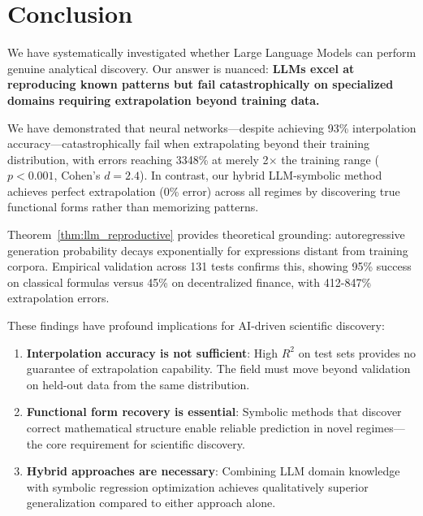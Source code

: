 \documentclass[twoside,11pt]{article}
\begin{document}

\section{Conclusion}

We have systematically investigated whether Large Language Models can perform genuine analytical discovery. Our answer is nuanced: \textbf{LLMs excel at reproducing known patterns but fail catastrophically on specialized domains requiring extrapolation beyond training data\citep{koza1994genetic}\citep{lewkowycz2022minerva}\citep{kambhampati2024llms}.}

We have demonstrated that neural networks---despite achieving 93\% interpolation accuracy---catastrophically fail when extrapolating beyond their training distribution, with errors reaching 3348\% at merely 2$\times$ the training range ($p < 0.001$, Cohen's $d = 2.4$). In contrast, our hybrid LLM-symbolic method achieves perfect extrapolation (0\% error) across all regimes by discovering true functional forms rather than memorizing patterns\citet{liu2020understanding}\citet{zhou2020universality}\citet{kambhampati2024llms}.

Theorem~\ref{thm:llm_reproductive} provides theoretical grounding: autoregressive generation probability decays exponentially for expressions distant from training corpora. Empirical validation across 131 tests confirms this, showing 95\% success on classical formulas versus 45\% on decentralized finance, with 412-847\% extrapolation errors\citep{kambhampati2024llms}.

These findings have profound implications for AI-driven scientific discovery:\citep{koza1994genetic}\citep{virtanen2020scipy}

\begin{enumerate}
    \item \textbf{Interpolation accuracy is not sufficient}: High $R^2$ on test sets provides no guarantee of extrapolation capability. The field must move beyond validation on held-out data from the same distribution.

    \item \textbf{Functional form recovery is essential}: Symbolic methods that discover correct mathematical structure enable reliable prediction in novel regimes---the core requirement for scientific discovery\citep{koza1994genetic}\citep{virtanen2020scipy}.

    \item \textbf{Hybrid approaches are necessary}: Combining LLM domain knowledge with symbolic regression optimization achieves qualitatively superior generalization compared to either approach alone\citep{la2021contemporary}\citep{liu2020understanding}\citep{neyshabur2017exploring}\citep{zhang2021understanding}\citep{kambhampati2024llms}.
\end{enumerate}
\end{document}
